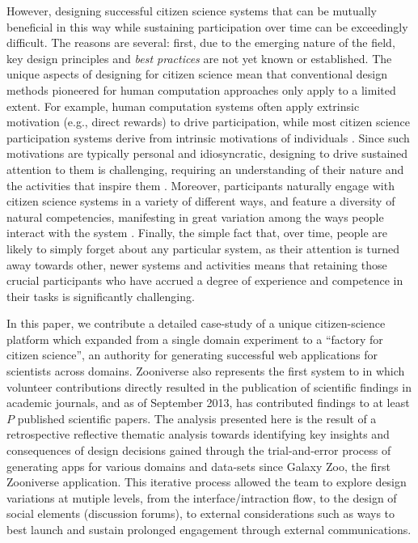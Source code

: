 \documentclass{sigchi}
\begin{document}
However, designing successful citizen science systems that can be mutually beneficial in this way while sustaining participation over time can be exceedingly difficult.  The reasons are several: first, due to the emerging nature of the field, key design principles and \emph{best practices} are not yet known or established.  The unique aspects of designing for citizen science mean that conventional design methods pioneered for human computation approaches only apply to a limited extent.  For example, human computation systems often apply extrinsic motivation (e.g., direct rewards) to drive participation, while most citizen science participation systems derive from intrinsic motivations of individuals \cite{extrinsic-vs-intrinsic}.  Since such motivations are typically personal and idiosyncratic, designing to drive sustained attention to them is challenging, requiring an understanding of their nature and the activities that inspire them \cite{}.  Moreover, participants naturally engage with citizen science systems in a variety of different ways, and feature a diversity of natural competencies, manifesting in great variation among the ways people interact with the system \cite{raddick}. Finally, the simple fact that, over time, people are likely to simply forget about any particular system, as their attention is turned away towards other, newer systems and activities means that retaining those crucial participants who have accrued a degree of experience and competence in their tasks is significantly challenging.


In this paper, we contribute a detailed case-study of a unique citizen-science platform which expanded from a single domain experiment to a ``factory for citizen science'', an authority for generating successful web applications for scientists across domains.  Zooniverse also represents the first system to in which volunteer contributions directly resulted in the publication of scientific findings in academic journals, and as of September 2013, has contributed findings to at least $P$ published scientific papers.  The analysis presented here is the result of a retrospective reflective thematic analysis towards identifying key insights and consequences of design decisions gained through the trial-and-error process of generating apps for various domains and data-sets since Galaxy Zoo, the first Zooniverse application.  This iterative process allowed the team to explore design variations at mutiple levels, from the interface/intraction flow, to the design of social elements (discussion forums), to external considerations such as ways to best launch and sustain prolonged engagement through external communications.
\end{document}
